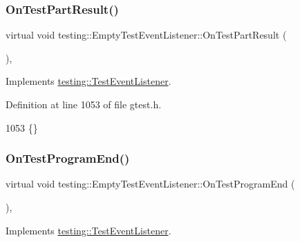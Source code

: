 \subsubsection{\texorpdfstring{On\+Test\+Part\+Result()}{OnTestPartResult()}}
{\footnotesize\ttfamily virtual void testing\+::\+Empty\+Test\+Event\+Listener\+::\+On\+Test\+Part\+Result (\begin{DoxyParamCaption}\item[{const \hyperlink{classtesting_1_1TestPartResult}{Test\+Part\+Result} \&}]{ }\end{DoxyParamCaption})\hspace{0.3cm}{\ttfamily [inline]}, {\ttfamily [virtual]}}



Implements \hyperlink{classtesting_1_1TestEventListener_a054f8705c883fa120b91473aff38f2ee}{testing\+::\+Test\+Event\+Listener}.



Definition at line 1053 of file gtest.\+h.


\begin{DoxyCode}
1053 \{\}
\end{DoxyCode}
\mbox{\label{classtesting_1_1EmptyTestEventListener_a0abcc02bd2331a2e29ad6f4d9daf2a32}} 
\subsubsection{\texorpdfstring{On\+Test\+Program\+End()}{OnTestProgramEnd()}}
{\footnotesize\ttfamily virtual void testing\+::\+Empty\+Test\+Event\+Listener\+::\+On\+Test\+Program\+End (\begin{DoxyParamCaption}\item[{const \hyperlink{classtesting_1_1UnitTest}{Unit\+Test} \&}]{ }\end{DoxyParamCaption})\hspace{0.3cm}{\ttfamily [inline]}, {\ttfamily [virtual]}}



Implements \hyperlink{classtesting_1_1TestEventListener_ad15b6246d94c268e233487a86463ef3d}{testing\+::\+Test\+Event\+Listener}.



